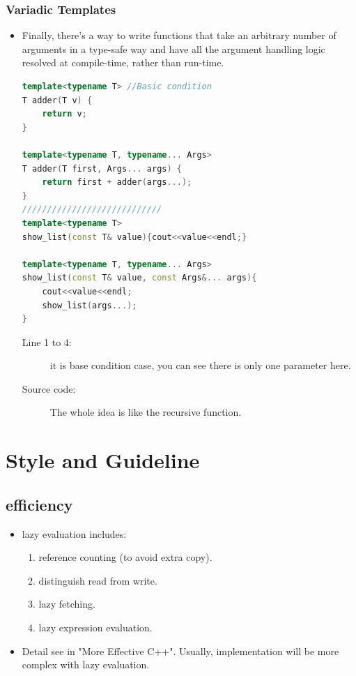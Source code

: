 \documentclass[a4paper,11pt,twoside]{book}
\begin{document}
\subsection{Variadic Templates}
\begin{itemize}
\item Finally, there's a way to write functions that take an arbitrary number of arguments in a type-safe way and have all the argument handling logic resolved at compile-time, rather than run-time.

\begin{lstlisting}[frame=single, language=c++]
template<typename T> //Basic condition
T adder(T v) {
	return v;
}

template<typename T, typename... Args>
T adder(T first, Args... args) {
	return first + adder(args...);
}
////////////////////////////
template<typename T>
show_list(const T& value){cout<<value<<endl;}

template<typename T, typename... Args>
show_list(const T& value, const Args&... args){
	cout<<value<<endl;
	show_list(args...);
}
\end{lstlisting}
\begin{description}
	\item[Line 1 to 4:] it is base condition case, you can see there is only one parameter here.
	\item[Source code:] The whole idea is like the recursive function.
\end{description}
\end{itemize}



\chapter{Style and Guideline}
\section{efficiency}
\begin{itemize}
	\item  lazy evaluation includes:
	\begin{enumerate}
		\item reference counting (to avoid extra copy).
		\item distinguish read from write.
		\item lazy fetching.
		\item lazy expression evaluation.
	\end{enumerate}
	\item Detail see in "More Effective C++". Usually, implementation will be  more complex with lazy evaluation.
\end{itemize}
\end{document}
